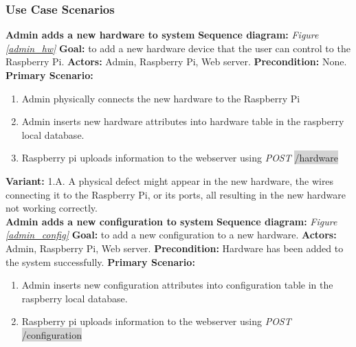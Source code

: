 \documentclass[12pt, oneside, a4paper]{book}
\newcommand{\code}[1]{{\color{red}\colorbox{lightgray}{#1}}}
\newcommand\boldcolor[1]{\textcolor{bold}{\textbf{#1}}}
\begin{document}
				\newpage\subsubsection{Use Case Scenarios}
				\boldcolor{Admin adds a new hardware to system}
				\newline\textbf{Sequence diagram:} \textit{Figure \ref{admin_hw}}
				\newline\textbf{Goal:} to add a new hardware device that the user can control to the Raspberry Pi.
				\newline\textbf{Actors:} Admin, Raspberry Pi, Web server.
				\newline\textbf{Precondition:} None.
				\newline\textbf{Primary Scenario:}	
				\begin{enumerate}[label*=\arabic*.]
					\item Admin physically connects the new hardware to the Raspberry Pi
					\item Admin inserts new hardware attributes into hardware table in the raspberry local database. 
					\item Raspberry pi uploads information to the webserver using \textit{POST} \code{/hardware}
				\end{enumerate}
				\textbf{Variant:}\newline
				\hspace*{5mm}1.A. A physical defect might appear in the new hardware, the wires connecting it to the Raspberry Pi, or its ports, all resulting in the new hardware not working correctly. \\
				\newline\boldcolor{Admin adds a new configuration to system}
				\newline\textbf{Sequence diagram:} \textit{Figure \ref{admin_config}}
				\newline\textbf{Goal:} to add a new configuration to a new hardware.
				\newline\textbf{Actors:} Admin, Raspberry Pi, Web server.
				\newline\textbf{Precondition:} Hardware has been added to the system successfully.
				\newline\textbf{Primary Scenario:}	
				\begin{enumerate}[label*=\arabic*.]
					\item Admin inserts new configuration attributes into configuration table in the raspberry local database. 
					\item Raspberry pi uploads information to the webserver using \textit{POST} \code{/configuration}
				\end{enumerate}
\end{document}
